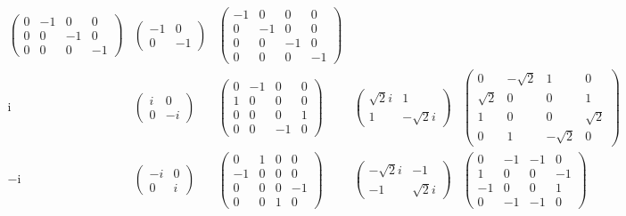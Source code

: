\documentclass[
]{book}
\theoremstyle{definition}
\theoremstyle{definition}
\theoremstyle{definition}
\theoremstyle{definition}
\theoremstyle{remark}
\begin{document}
\[\begin{array}{ccccc}
\begin{pmatrix}
0 & -1 & 0 & 0\\
0 & 0 & -1 & 0\\
0 & 0 & 0 & -1
\end{pmatrix} & \begin{pmatrix}-1 & 0\\
0 & -1
\end{pmatrix} & \begin{pmatrix}-1 & 0 & 0 & 0\\
0 & -1 & 0 & 0\\
0 & 0 & -1 & 0\\
0 & 0 & 0 & -1
\end{pmatrix}\\
\mathrm{i} & \begin{pmatrix}i & 0\\
0 & -i
\end{pmatrix} & \begin{pmatrix}0 & -1 & 0 & 0\\
1 & 0 & 0 & 0\\
0 & 0 & 0 & 1\\
0 & 0 & -1 & 0
\end{pmatrix} & \begin{pmatrix}\sqrt{2}i & 1\\
1 & -\sqrt{2}i
\end{pmatrix} & \begin{pmatrix}0 & -\sqrt{2} & 1 & 0\\
\sqrt{2} & 0 & 0 & 1\\
1 & 0 & 0 & \sqrt{2}\\
0 & 1 & -\sqrt{2} & 0
\end{pmatrix}\\
-\mathrm{i} & \begin{pmatrix}-i & 0\\
0 & i
\end{pmatrix} & \begin{pmatrix}0 & 1 & 0 & 0\\
-1 & 0 & 0 & 0\\
0 & 0 & 0 & -1\\
0 & 0 & 1 & 0
\end{pmatrix} & \begin{pmatrix}-\sqrt{2}i & -1\\
-1 & \sqrt{2}i
\end{pmatrix} & \begin{pmatrix}0 & -1 & -1 & 0\\
1 & 0 & 0 & -1\\
-1 & 0 & 0 & 1\\
0 & -1 & -1 & 0

\end{pmatrix}
\end{array}\]
\end{document}
